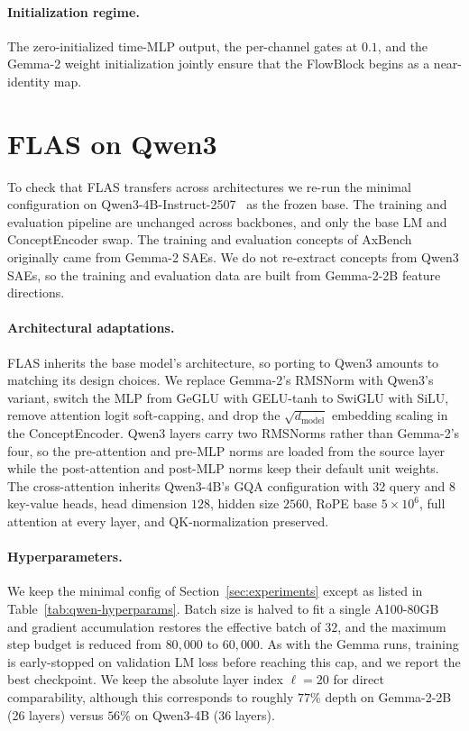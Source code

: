 \documentclass{article}
\begin{document}
\paragraph{Initialization regime.}
The zero-initialized time-MLP output, the per-channel gates at $0.1$, and the Gemma-2 weight initialization jointly ensure that the FlowBlock begins as a near-identity map. 

\section{FLAS on Qwen3}
\label{app:qwen}

To check that FLAS transfers across architectures we re-run the minimal configuration on Qwen3-4B-Instruct-2507~\citep{Yang2025c} as the frozen base. The training and evaluation pipeline are unchanged across backbones, and only the base LM and ConceptEncoder swap. The training and evaluation concepts of AxBench originally came from Gemma-2 SAEs. We do not re-extract concepts from Qwen3 SAEs, so the training and evaluation data are built from Gemma-2-2B feature directions.

\paragraph{Architectural adaptations.}
FLAS inherits the base model's architecture, so porting to Qwen3 amounts to matching its design choices. We replace Gemma-2's RMSNorm with Qwen3's variant, switch the MLP from GeGLU with GELU-tanh to SwiGLU with SiLU, remove attention logit soft-capping, and drop the $\sqrt{d_\text{model}}$ embedding scaling in the ConceptEncoder. Qwen3 layers carry two RMSNorms rather than Gemma-2's four, so the pre-attention and pre-MLP norms are loaded from the source layer while the post-attention and post-MLP norms keep their default unit weights. The cross-attention inherits Qwen3-4B's GQA configuration with 32 query and 8 key-value heads, head dimension $128$, hidden size $2560$, RoPE base $5\times10^6$, full attention at every layer, and QK-normalization preserved.

\paragraph{Hyperparameters.}
We keep the minimal config of Section~\ref{sec:experiments} except as listed in Table~\ref{tab:qwen-hyperparams}. Batch size is halved to fit a single A100-80GB and gradient accumulation restores the effective batch of $32$, and the maximum step budget is reduced from $80{,}000$ to $60{,}000$. As with the Gemma runs, training is early-stopped on validation LM loss before reaching this cap, and we report the best checkpoint. We keep the absolute layer index $\ell\!=\!20$ for direct comparability, although this corresponds to roughly $77\%$ depth on Gemma-2-2B (26 layers) versus $56\%$ on Qwen3-4B (36 layers).
\end{document}
